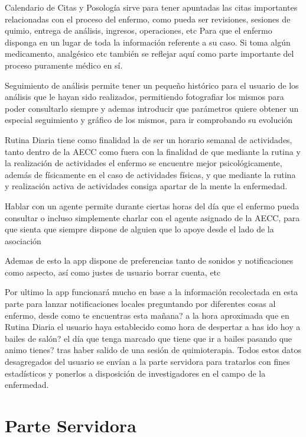 \documentclass[../pfc.tex]{subfiles}
\begin{document}
	Calendario de Citas y Posología sirve para tener apuntadas las citas importantes relacionadas con el proceso del enfermo, como pueda ser revisiones, sesiones de quimio, entrega de análisis, ingresos, operaciones, etc Para que el enfermo disponga en un lugar de toda la información referente a su caso. Si toma algún medicamento, analgésico etc también se reflejar aquí como parte importante del proceso puramente médico en sí.
	
	Seguimiento de análisis permite tener un pequeño histórico para el usuario de los análisis que le hayan sido realizados, permitiendo fotografiar los mismos para poder consultarlo siempre y ademas introducir que parámetros quiere obtener un especial seguimiento y gráfico de los mismos, para ir comprobando su evolución 
	
	Rutina Diaria tiene como finalidad la de ser un horario semanal de actividades, tanto dentro de la AECC como fuera con la finalidad de que mediante la rutina y la realización de actividades el enfermo se encuentre mejor psicológicamente, además de físicamente en el caso de actividades físicas, y que mediante la rutina y realización activa de actividades consiga apartar de la mente la enfermedad.
	
	Hablar con un agente permite durante ciertas horas del día que el enfermo pueda consultar o incluso simplemente charlar con el agente asignado de la AECC, para que sienta que siempre dispone de alguien que lo apoye desde el lado de la asociación 
	  
	Ademas de esto la app dispone de preferencias tanto de sonidos y notificaciones como aspecto, así como justes de usuario borrar cuenta, etc
	
	Por ultimo la app funcionará mucho en base a la información recolectada en esta parte para lanzar notificaciones locales preguntando por diferentes cosas al enfermo, desde como te encuentras esta mañana? a la hora aproximada que en Rutina Diaria el usuario haya establecido como hora de despertar a has ido hoy a bailes de salón? el día que tenga marcado que tiene que ir a bailes pasando que animo tienes? tras haber salido de una sesión de quimioterapia. Todos estos datos desagregados del usuario se envían a la parte servidora para tratarlos con fines estadísticos y ponerlos a disposición de investigadores en el campo de la enfermedad.
	
	\section{Parte Servidora}
	
\end{document}

